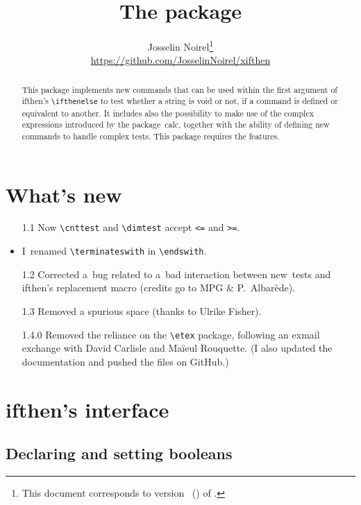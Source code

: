 \documentclass{article}
\title  {The \pack{xifthen} package}
\author {Josselin Noirel\footnote{This document corresponds to version
  \fileversion\ (\filedate) of \pack{\filename}.}\\%
\url{https://github.com/JosselinNoirel/xifthen}}
\makeatletter
\newcommand*{\cmd}[1]{\tex{\textbackslash #1}}
\newcommand*{\tex}{\texttt}
\newcommand*{\1}{$_1\m@th$}
\newcommand*{\2}{$_2\m@th$}
\newcommand*{\pack}{\textsf}
\makeatother
\begin{document}
\maketitle

\begin{abstract}
  This package implements new commands that can be used within the
  first argument of \pack{ifthen}'s \cmd{ifthenelse} to test whether a
  string is void or not, if a command is defined or equivalent to
  another.  It includes also the possibility to make use of the
  complex expressions introduced by the package~\pack{calc}, together
  with the ability of defining new commands to handle complex tests.
  This package requires the \eTeX{} features.
\end{abstract}

\tableofcontents

\section{What's new}

\begin{itemize}
\item [1.1] Now \cmd{cnttest} and \cmd{dimtest} accept \tex{<=} and \tex{>=}.
\item I~renamed \cmd{terminateswith} in \cmd{endswith}.

\addvspace{\baselineskip}

\item [1.2] Corrected a~bug related to a~bad interaction between
  new~tests and ifthen's replacement macro (credits go to MPG \&
  P.~Albar\`ede).

\addvspace{\baselineskip}

\item [1.3] Removed a spurious space (thanks to Ulrike Fisher).

\item [1.4.0] Removed the reliance on the \cmd{etex} package, following
      an exmail exchange with David Carlisle and Maïeul Rouquette.
      (I also updated the documentation and pushed the files on GitHub.)
\end{itemize}

\section{\pack{ifthen}'s interface}

\subsection{Declaring and setting booleans}
\end{document}
